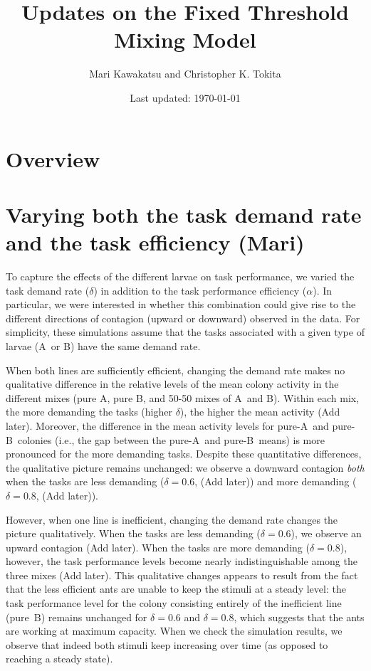 \documentclass[11pt]{article}
\title{\vspace{-30pt}Updates on the Fixed Threshold Mixing Model}
\author{Mari Kawakatsu and Christopher K. Tokita\vspace{-10pt}}
\date{Last updated: \today}
\newcommand{\A}{{\color{red}A}}
\newcommand{\B}{{\color{blue}B}}
\newcommand{\later}{{\color{red}(Add later)}}
\begin{document}
\maketitle

\tableofcontents

\section{Overview}

\newpage
\section{Varying both the task demand rate and the task efficiency (Mari)}

To capture the effects of the different larvae on task performance, we varied the task demand rate ($\delta$) in addition to the task performance efficiency ($\alpha$). In particular, we were interested in whether this combination could give rise to the different directions of contagion (upward or downward) observed in the data. 
For simplicity, these simulations assume that the tasks associated with a given type of larvae (\A\ or \B) have the same demand rate.

When both lines are sufficiently efficient, changing the demand rate makes no qualitative difference in the relative levels of the mean colony activity in the different mixes (pure \A, pure \B, and 50-50 mixes of \A\ and \B). Within each mix, the more demanding the tasks (higher $\delta$), the higher the mean activity \later.  Moreover, the difference in the mean activity levels for pure-\A\ and pure-\B\ colonies (i.e., the gap between the pure-\A\ and pure-\B\ means) is more pronounced for the more demanding tasks. Despite these quantitative differences, the qualitative picture remains unchanged:
we observe a downward contagion \textit{both} when the tasks are less demanding ($\delta = 0.6$, \later) and more demanding ($\delta = 0.8$, \later).

However, when one line is inefficient, changing the demand rate changes the picture qualitatively. When the tasks are less demanding ($\delta = 0.6$), we observe an upward contagion \later. When the tasks are more demanding ($\delta = 0.8$), however, the task performance levels become nearly indistinguishable among the three mixes \later. This qualitative changes appears to result from the fact that the less efficient ants are unable to keep the stimuli at a steady level: the task performance level for the colony consisting entirely of the inefficient line (pure~\B) remains unchanged for $\delta = 0.6$ and $\delta = 0.8$, which suggests that the ants are working at maximum capacity. When we check the simulation results, we observe that indeed both stimuli keep increasing over time (as opposed to reaching a steady state).
\end{document}
